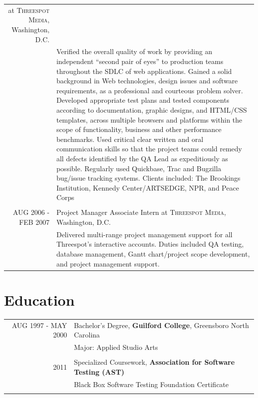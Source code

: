 \documentclass[a4paper,10pt]{article}
\begin{document}
\begin{tabular}{r|p{11cm}}
at \textsc{Threespot Media}, Washington, D.C.\\&\footnotesize{Verified the overall quality of work by providing an independent “second pair of eyes” to production teams throughout the SDLC of web applications. Gained a solid background in Web technologies, design issues and software requirements, as a professional and courteous problem solver. Developed appropriate test plans and tested components according to documentation, graphic designs, and HTML/CSS templates, across multiple browsers and platforms within the scope of functionality, business and other performance benchmarks. Used critical clear written and oral communication skills so that the project teams could remedy all defects identified by the QA Lead as expeditiously as possible. Regularly used Quickbase, Trac and Bugzilla bug/issue tracking systems.
Clients included: The Brookings Institution, Kennedy Center/ARTSEDGE, NPR, and Peace Corps}\\\multicolumn{2}{c}{} \\
\textsc{AUG 2006 - FEB 2007} & Project Manager Associate Intern
at \textsc{Threespot Media}, Washington, D.C.\\&\footnotesize{Delivered multi-range project management support for all Threespot’s interactive accounts.  Duties included QA testing, database management, Gantt chart/project scope development, and project management support.}
\end{tabular}

\section{Education}
\begin{tabular}{rl}
\textsc{AUG 1997 - MAY 2000}  & Bachelor's Degree, \textbf{Guilford College}, Greensboro North Carolina\\
& Major: Applied Studio Arts\\&\\
\textsc2011& Specialized Coursework, \textbf{Association for Software Testing (AST)}\\
&\normalsize Black Box Software Testing Foundation Certificate\\&\\
\end{tabular}
\end{document}
